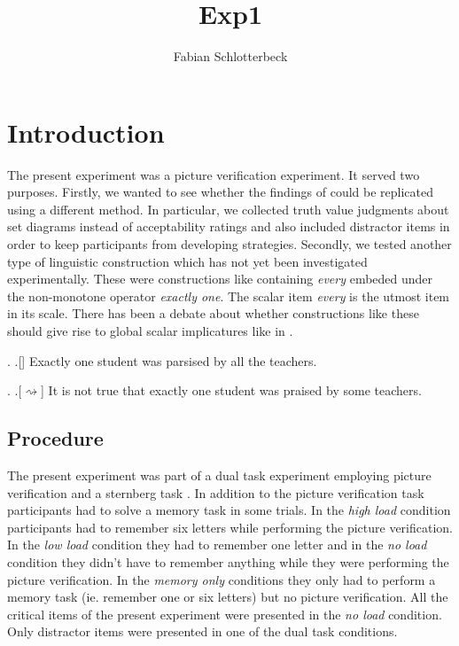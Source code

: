 \documentclass[a4paper,10pt]{article}
\title{Exp1}
\author{Fabian Schlotterbeck}
\begin{document}
\maketitle



\section{Introduction}
The present experiment was a picture verification experiment. It served two purposes. Firstly, we wanted to see whether the findings of  could be replicated using a different method. In particular, we collected truth value judgments about set diagrams instead of acceptability ratings and also included distractor items in order to keep participants from developing strategies. Secondly, we tested another type of linguistic construction which has not yet been investigated experimentally. These were constructions  like \Next containing {\it every} embeded under the non-monotone operator {\it exactly one}. The scalar item {\it every} is the utmost item in its scale. There has been a debate about whether constructions like these should give rise to global scalar implicatures like in \NNext {}.

\ex. \a.[]   Exactly one student was parsised by all the teachers. 

\ex. \a.[$\rightsquigarrow$] It is not true that exactly one student was praised by some teachers. 

\subsection{Procedure}
The present experiment was part of a dual task experiment employing picture verification and a sternberg task \cite{Sternberg1966}. In addition to the picture verification task participants had to solve a memory task in some trials. In the {\it high load} condition participants had to remember six letters while performing the picture verification. In the {\it low load} condition they had to remember one letter and in the {\it no load} condition they didn't have to remember anything while they were performing the picture verification. In the {\it memory only} conditions they only had to perform a memory task (ie. remember one or six letters) but no picture verification. All the critical items of the present experiment were presented in the {\it no load} condition. Only distractor items were presented in one of the dual task conditions.  
\end{document}
